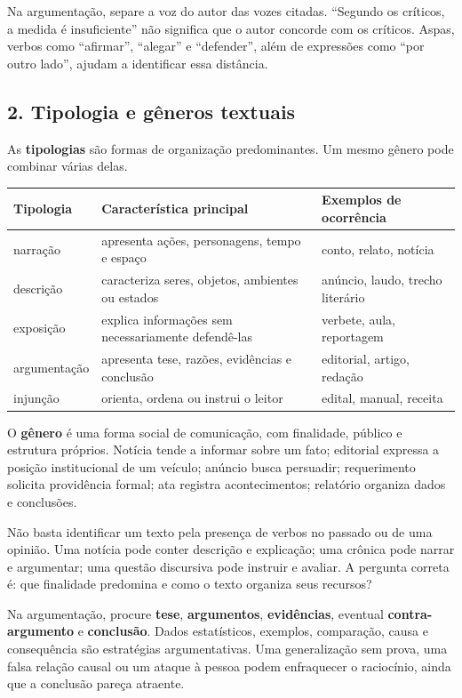\documentclass[11pt,a4paper]{article}
\begin{document}
Na argumentação, separe a voz do autor das vozes citadas. “Segundo os críticos, a medida é insuficiente” não significa que o autor concorde com os críticos. Aspas, verbos como “afirmar”, “alegar” e “defender”, além de expressões como “por outro lado”, ajudam a identificar essa distância.

\subsection*{2. Tipologia e gêneros textuais}

As \textbf{tipologias} são formas de organização predominantes. Um mesmo gênero pode combinar várias delas.

\begin{tabularx}{\linewidth}{llX}
\toprule
 \textbf{Tipologia} & \textbf{Característica principal} & \textbf{Exemplos de ocorrência} \\
\midrule
 narração & apresenta ações, personagens, tempo e espaço & conto, relato, notícia \\
 descrição & caracteriza seres, objetos, ambientes ou estados & anúncio, laudo, trecho literário \\
 exposição & explica informações sem necessariamente defendê-las & verbete, aula, reportagem \\
 argumentação & apresenta tese, razões, evidências e conclusão & editorial, artigo, redação \\
 injunção & orienta, ordena ou instrui o leitor & edital, manual, receita \\
\bottomrule
\end{tabularx}


O \textbf{gênero} é uma forma social de comunicação, com finalidade, público e estrutura próprios. Notícia tende a informar sobre um fato; editorial expressa a posição institucional de um veículo; anúncio busca persuadir; requerimento solicita providência formal; ata registra acontecimentos; relatório organiza dados e conclusões.

Não basta identificar um texto pela presença de verbos no passado ou de uma opinião. Uma notícia pode conter descrição e explicação; uma crônica pode narrar e argumentar; uma questão discursiva pode instruir e avaliar. A pergunta correta é: que finalidade predomina e como o texto organiza seus recursos?

Na argumentação, procure \textbf{tese}, \textbf{argumentos}, \textbf{evidências}, eventual \textbf{contra-argumento} e \textbf{conclusão}. Dados estatísticos, exemplos, comparação, causa e consequência são estratégias argumentativas. Uma generalização sem prova, uma falsa relação causal ou um ataque à pessoa podem enfraquecer o raciocínio, ainda que a conclusão pareça atraente.
\end{document}
